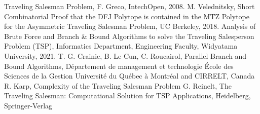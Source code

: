 \documentclass[a4paper,12pt]{report}
\begin{document}
%
%

\begin{thebibliography}{00}
Traveling Salesman Problem, F. Greco, IntechOpen, 2008.
M. Velednitsky, Short Combinatorial Proof that the DFJ Polytope is contained in
the MTZ Polytope for the Asymmetric Traveling Salesman Problem, UC Berkeley, 2018.
%
Analysis of Brute Force and Branch \& Bound Algorithms to solve the Traveling
Salesperson Problem (TSP), Informatics Department, Engineering Faculty, Widyatama University, 2021.
%
T. G. Crainic, B. Le Cun, C. Roucairol, Parallel Branch-and-Bound Algorithms, Département de management et technologie École des Sciences de la Gestion Université du Québec à Montréal and CIRRELT, Canada
%
R. Karp, Complexity of the Traveling Salesman Problem
%
G. Reinelt, The Traveling Salesman: Computational Solution for TSP Applications, Heidelberg, Springer-Verlag
%
\end{thebibliography}
% 
\end{document}
